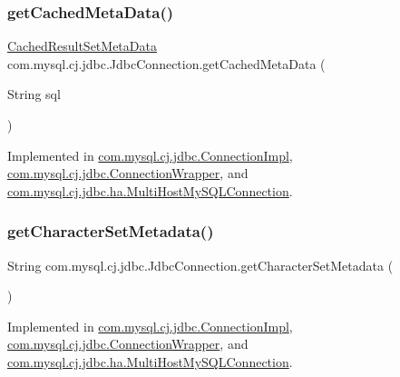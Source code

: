 \subsubsection{\texorpdfstring{get\+Cached\+Meta\+Data()}{getCachedMetaData()}}
{\footnotesize\ttfamily \mbox{\hyperlink{interfacecom_1_1mysql_1_1cj_1_1jdbc_1_1result_1_1_cached_result_set_meta_data}{Cached\+Result\+Set\+Meta\+Data}} com.\+mysql.\+cj.\+jdbc.\+Jdbc\+Connection.\+get\+Cached\+Meta\+Data (\begin{DoxyParamCaption}\item[{String}]{sql }\end{DoxyParamCaption})}



Implemented in \mbox{\hyperlink{classcom_1_1mysql_1_1cj_1_1jdbc_1_1_connection_impl_a8c812f82a9cb453fa511263b0c024362}{com.\+mysql.\+cj.\+jdbc.\+Connection\+Impl}}, \mbox{\hyperlink{classcom_1_1mysql_1_1cj_1_1jdbc_1_1_connection_wrapper_ae2f849b8dfe297d894d2a4730ea538a9}{com.\+mysql.\+cj.\+jdbc.\+Connection\+Wrapper}}, and \mbox{\hyperlink{classcom_1_1mysql_1_1cj_1_1jdbc_1_1ha_1_1_multi_host_my_s_q_l_connection_aa19a1c9b0278b332547fdb7b8e8c0309}{com.\+mysql.\+cj.\+jdbc.\+ha.\+Multi\+Host\+My\+S\+Q\+L\+Connection}}.

\mbox{\label{interfacecom_1_1mysql_1_1cj_1_1jdbc_1_1_jdbc_connection_a1bf742d4ab1a9e354ab3c810caa40481}} 
\subsubsection{\texorpdfstring{get\+Character\+Set\+Metadata()}{getCharacterSetMetadata()}}
{\footnotesize\ttfamily String com.\+mysql.\+cj.\+jdbc.\+Jdbc\+Connection.\+get\+Character\+Set\+Metadata (\begin{DoxyParamCaption}{ }\end{DoxyParamCaption})}



Implemented in \mbox{\hyperlink{classcom_1_1mysql_1_1cj_1_1jdbc_1_1_connection_impl_ac1333e56c524a3b5436c575ee82b0c18}{com.\+mysql.\+cj.\+jdbc.\+Connection\+Impl}}, \mbox{\hyperlink{classcom_1_1mysql_1_1cj_1_1jdbc_1_1_connection_wrapper_a9a87d9e8c68060ab8e1b308ddc5886f9}{com.\+mysql.\+cj.\+jdbc.\+Connection\+Wrapper}}, and \mbox{\hyperlink{classcom_1_1mysql_1_1cj_1_1jdbc_1_1ha_1_1_multi_host_my_s_q_l_connection_ae2ebfd196578e13481ef5f604675acc1}{com.\+mysql.\+cj.\+jdbc.\+ha.\+Multi\+Host\+My\+S\+Q\+L\+Connection}}.

